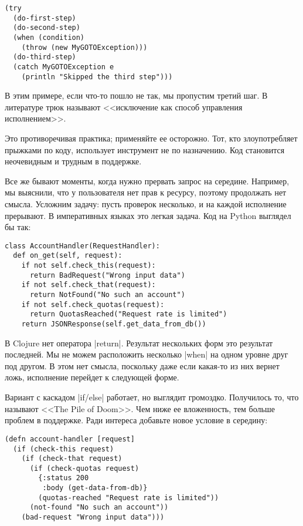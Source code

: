 \begin{verbatim}
(try
  (do-first-step)
  (do-second-step)
  (when (condition)
    (throw (new MyGOTOException)))
  (do-third-step)
  (catch MyGOTOException e
    (println "Skipped the third step")))
\end{verbatim}

В этим примере, если что-то пошло не так, мы пропустим третий шаг. В литературе
трюк называют <<исключение как способ управления исполнением>>.

Это противоречивая практика; применяйте ее осторожно. Тот, кто злоупотребляет
прыжками по коду, использует инструмент не по назначению. Код становится
неочевидным и трудным в поддержке.

Все же бывают моменты, когда нужно прервать запрос на середине. Например, мы
выяснили, что у пользователя нет прав к ресурсу, поэтому продолжать нет
смысла. Усложним задачу: пусть проверок несколько, и на каждой исполнение
прерывают. В императивных языках это легкая задача. Код на Python выглядел бы
так:

\begin{verbatim}
class AccountHandler(RequestHandler):
  def on_get(self, request):
    if not self.check_this(request):
      return BadRequest("Wrong input data")
    if not self.check_that(request):
      return NotFound("No such an account")
    if not self.check_quotas(request):
      return QuotasReached("Request rate is limited")
    return JSONResponse(self.get_data_from_db())
\end{verbatim}

В Clojure нет оператора \spverb|return|. Результат нескольких форм это результат
последней. Мы не можем расположить несколько \spverb|when| на одном уровне друг
под другом. В этом нет смысла, поскольку даже если какая-то из них вернет ложь,
исполнение перейдет к следующей форме.

Вариант с каскадом \spverb|if/else| работает, но выглядит громоздко. Получилось
то, что называют <<The Pile of Doom>>. Чем ниже ее вложенность, тем больше
проблем в поддержке. Ради интереса добавьте новое условие в середину:

\begin{verbatim}
(defn account-handler [request]
  (if (check-this request)
    (if (check-that request)
      (if (check-quotas request)
        {:status 200
         :body (get-data-from-db)}
        (quotas-reached "Request rate is limited"))
      (not-found "No such an account"))
    (bad-request "Wrong input data")))
\end{verbatim}

